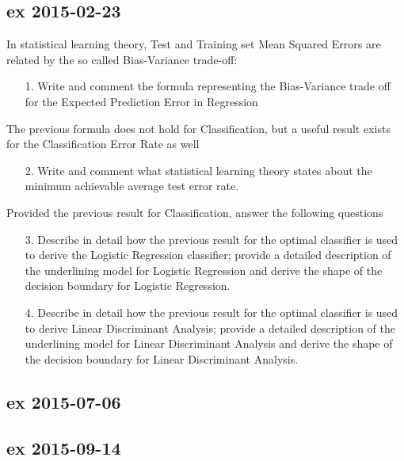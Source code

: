 \documentclass[a4paper,12pt,titlepage]{article} %
\begin{document}
\subsection{ex 2015-02-23}
In statistical learning theory, Test and Training set Mean Squared Errors are related by the so called Bias-Variance trade-off:
\begin{itemize}
\item[1.] Write and comment the formula representing the Bias-Variance trade off for the Expected Prediction Error in Regression
\end{itemize}

The previous formula does not hold for Classification, but a useful result exists for the Classification Error Rate as well

\begin{itemize}
\item[2.] Write and comment what statistical learning theory states about the minimum achievable average test error rate.
\end{itemize}

Provided the previous result for Classification, answer the following questions

\begin{itemize}
\item[3.] Describe in detail how the previous result for the optimal classifier is used to derive the Logistic Regression classifier; provide a detailed description of the underlining model for Logistic Regression and derive the shape of the decision boundary for Logistic Regression.
\item[4.] Describe in detail how the previous result for the optimal classifier is used to derive Linear Discriminant Analysis; provide a detailed description of the underlining model for Linear Discriminant Analysis and derive the shape of the decision boundary for Linear Discriminant Analysis.
\end{itemize}


\subsection{ex 2015-07-06}

\subsection{ex 2015-09-14}
\end{document}
